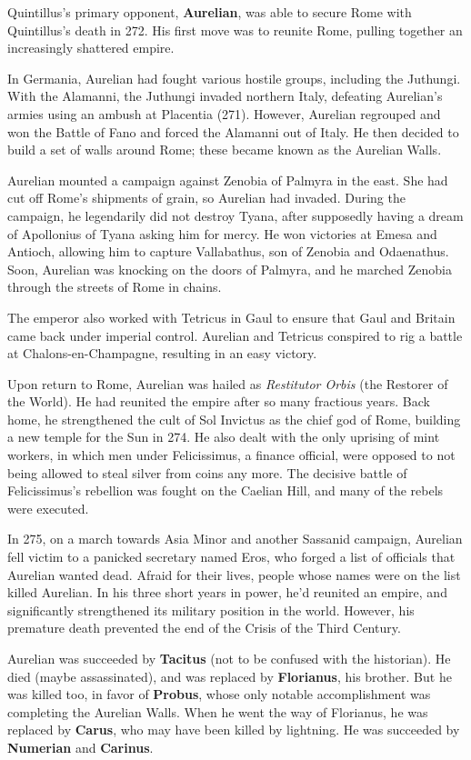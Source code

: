 Quintillus's primary opponent, \textbf{Aurelian},
was able to secure Rome with Quintillus's death in 272.
His first move was to reunite Rome, pulling together an increasingly shattered empire.

In Germania, Aurelian had fought various hostile groups, including the Juthungi.
With the Alamanni, the Juthungi invaded northern Italy,
defeating Aurelian's armies using an ambush at Placentia (271).
However, Aurelian regrouped and won the Battle of Fano and forced the Alamanni out of Italy.
He then decided to build a set of walls around Rome; these became known as the Aurelian Walls.

Aurelian mounted a campaign against Zenobia of Palmyra in the east.
She had cut off Rome's shipments of grain, so Aurelian had invaded.
During the campaign, he legendarily did not destroy Tyana,
after supposedly having a dream of Apollonius of Tyana asking him for mercy.
He won victories at Emesa and Antioch,
allowing him to capture Vallabathus, son of Zenobia and Odaenathus.
Soon, Aurelian was knocking on the doors of Palmyra,
and he marched Zenobia through the streets of Rome in chains.

The emperor also worked with Tetricus in Gaul
to ensure that Gaul and Britain came back under imperial control.
Aurelian and Tetricus conspired to rig a battle at Chalons-en-Champagne,
resulting in an easy victory.

Upon return to Rome, Aurelian was hailed as \textit{Restitutor Orbis} (the Restorer of the World).
He had reunited the empire after so many fractious years.
Back home, he strengthened the cult of Sol Invictus as the chief god of Rome,
building a new temple for the Sun in 274.
He also dealt with the only uprising of mint workers,
in which men under Felicissimus, a finance official,
were opposed to not being allowed to steal silver from coins any more.
The decisive battle of Felicissimus's rebellion was fought on the Caelian Hill,
and many of the rebels were executed.

In 275, on a march towards Asia Minor and another Sassanid campaign,
Aurelian fell victim to a panicked secretary named Eros,
who forged a list of officials that Aurelian wanted dead.
Afraid for their lives, people whose names were on the list killed Aurelian.
In his three short years in power, he'd reunited an empire,
and significantly strengthened its military position in the world.
However, his premature death prevented the end of the Crisis of the Third Century.

Aurelian was succeeded by \textbf{Tacitus} (not to be confused with the historian).
He died (maybe assassinated), and was replaced by \textbf{Florianus}, his brother.
But he was killed too, in favor of \textbf{Probus},
whose only notable accomplishment was completing the Aurelian Walls.
When he went the way of Florianus, he was replaced by \textbf{Carus},
who may have been killed by lightning.
He was succeeded by \textbf{Numerian} and \textbf{Carinus}.

